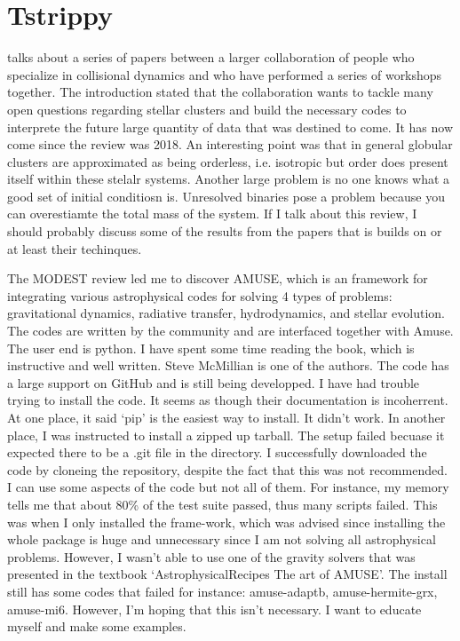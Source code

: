    
    

\section{Tstrippy}

    \citet{2018ComAC...5....2V} talks about a series of papers between a larger collaboration of people who specialize in collisional dynamics and who have performed a series of workshops together. The introduction stated that the collaboration wants to tackle many open questions regarding stellar clusters and build the necessary codes to interprete the future large quantity of data that was destined to come. It has now come since the review was 2018. An interesting point was that in general globular clusters are approximated as being orderless, i.e. isotropic but order does present itself within these stelalr systems. Another large problem is no one knows what a good set of initial conditiosn is. Unresolved binaries pose a problem because you can overestiamte the total mass of the system. If I talk about this review, I should probably discuss some of the results from the papers that is builds on or at least their techinques.

    The MODEST review led me to discover AMUSE, which is an framework for integrating various astrophysical codes for solving 4 types of problems: gravitational dynamics, radiative transfer, hydrodynamics, and stellar evolution. The codes are written by the community and are interfaced together with Amuse. The user end is python. I have spent some time reading the book, which is instructive and well written. Steve McMillian is one of the authors. The code has a large support on GitHub and is still being developped. I have had trouble trying to install the code. It seems as though their documentation is incoherrent. At one place, it said `pip' is the easiest way to install. It didn't work. In another place, I was instructed to install a zipped up tarball. The setup failed becuase it expected there to be a .git file in the directory. I successfully downloaded the code by cloneing the repository, despite the fact that this was not recommended. I can use some aspects of the code but not all of them. For instance, my memory tells me that about 80\% of the test suite passed, thus many scripts failed. This was when I only installed the frame-work, which was advised since installing the whole package is huge and unnecessary since I am not solving all astrophysical problems. However, I wasn't able to use one of the gravity solvers that was presented in the textbook `AstrophysicalRecipes The art of AMUSE'. The install still has some codes that failed for instance: amuse-adaptb, amuse-hermite-grx, amuse-mi6. However, I'm hoping that this isn't necessary. I want to educate myself and make some examples. 


